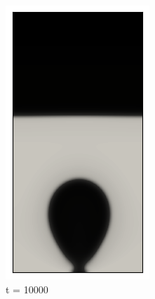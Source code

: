\begin{figure}[h!]
\begin{subfigure}{0.25\textwidth}
		\includegraphics[width=\linewidth]{figs/cap4/bubble_10}
		\caption{t = 10000}
		\label{fig:2}
	\end{subfigure}\hfil 
	\begin{subfigure}{0.25\textwidth}

\end{subfigure}
\end{figure}
